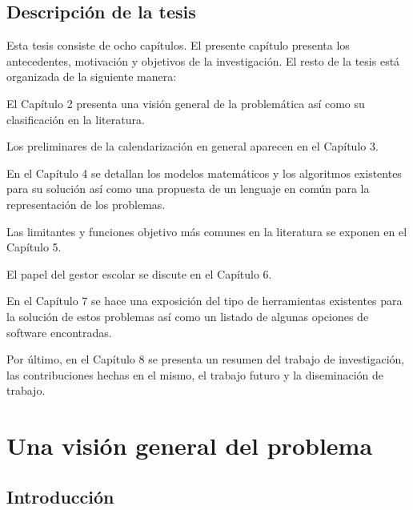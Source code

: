 \documentclass[draft,12pt,headsepline,footsepline,paper=letter]{scrreprt}
\begin{document}
\section{Descripción de la tesis}

Esta tesis consiste de ocho capítulos. El presente capítulo presenta los antecedentes, motivación y objetivos de la investigación. El resto de la tesis está organizada de la siguiente manera:

El Capítulo 2 presenta una visión general de la problemática así como su clasificación en la literatura.

Los preliminares de la calendarización en general aparecen en el Capítulo 3.

En el Capítulo 4 se detallan los modelos matemáticos y los algoritmos existentes para su solución así como una propuesta de un lenguaje en común para la representación de los problemas.

Las limitantes y funciones objetivo más comunes en la literatura se exponen en el Capítulo 5.

El papel del gestor escolar se discute en el Capítulo 6.

En el Capítulo 7 se hace una exposición del tipo de herramientas existentes para la solución de estos problemas así como un listado de algunas opciones de software encontradas.

Por último, en el Capítulo 8 se presenta un resumen del trabajo de investigación, las contribuciones hechas en el mismo, el trabajo futuro y la diseminación de trabajo.

\chapter{Una visión general del problema}


\section{Introducción}
\end{document}
